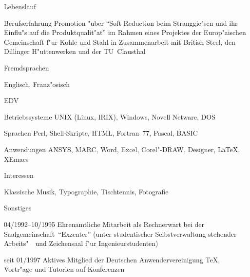 \documentclass[12pt,a4paper]{article}
\newcommand*{\ac}[1]{\mbox{#1}}
\begin{document}
\begin{cv}{Lebenslauf}
\begin{cvlist}{Berufserfahrung}
    Promotion "uber "`Soft Reduction beim Stranggie"sen und ihr
    Einflu"s auf die Produktqualit"at"' im Rahmen eines Projektes der
    Europ"aischen Gemeinschaft f"ur Kohle und Stahl in Zusammenarbeit
    mit British Steel, den Dillinger H"uttenwerken und der
    TU~Clausthal
  \end{cvlist}
  \begin{cvlist}{Fremdsprachen}
  \item Englisch, Franz"osisch
  \end{cvlist}
  \begin{cvlist}{\ac{EDV}}
  \item[Betriebssysteme] \ac{UNIX} (Linux, \ac{IRIX}), Windows, Novell
    Netware, \ac{DOS}
  \item[Sprachen] Perl, Shell-Skripte, \ac{HTML}, Fortran~77, Pascal,
    \ac{BASIC}
  \item[Anwendungen] \ac{ANSYS}, \ac{MARC}, Word, Excel, Corel"-DRAW,
    Designer, LaTeX, XEmacs
  \end{cvlist}
  \begin{cvlist}{Interessen}
  \item Klassische Musik, Typographie, Tischtennis, Fotografie
  \end{cvlist}
  \begin{cvlist}{Sonstiges}
  \item[04/1992--10/1995] Ehrenamtliche Mitarbeit als Rechnerwart bei
    der Saalgemeinschaft~"`Exzenter"' (unter studentischer
    Selbstverwaltung stehender Arbeits"~~und Zeichensaal f"ur
    Ingenieurstudenten)
  \item[seit 01/1997] Aktives Mitglied der Deutschen
    Anwendervereinigung TeX, Vortr"age und Tutorien auf Konferenzen
  \end{cvlist}
  \date{13.~September~1999}
\end{cv}
\end{document}
